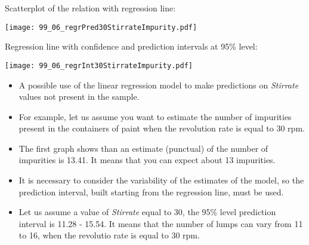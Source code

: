 \begin{frame}
  Scatterplot of the relation with regression line:\\
  \vspace{.3cm}
  \begin{center}
    \texttt{[image: 99\_06\_regrPred30StirrateImpurity.pdf]}
  \end{center}
\end{frame}

\begin{frame}
  Regression line with confidence and prediction intervals at 95\% level:\\
  \vspace{.3cm}
  \begin{center}
    \texttt{[image: 99\_06\_regrInt30StirrateImpurity.pdf]}
  \end{center}
\end{frame}

\begin{frame}
  \vspace{.25cm}
  \begin{small}
  \begin{itemize}
     \item A possible use of the linear regression model to make predictions on \textit{Stirrate} values not present in the sample.
     \item For example, let us assume you want to estimate the number of impurities present in the containers of paint when the revolution rate is equal to 30 rpm.
     \item The first graph shows than an estimate (punctual) of the number of impurities is 13.41. It means that you can expect about 13 impurities.
     \item It is necessary to consider the variability of the estimates of the model, so the prediction interval, built starting from the regression line, must be used.
     \item Let us assume a value of \textit{Stirrate} equal to 30, the 95\% level prediction interval is 11.28 - 15.54. It means that the number of lumps can vary from 11 to 16, when the revolutio rate is equal to 30 rpm. 
  \end{itemize}
  \end{small}
\end{frame}





